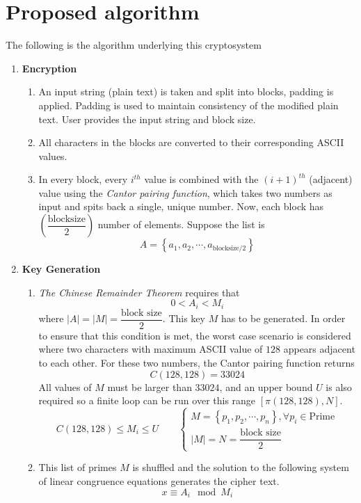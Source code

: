 \section{Proposed algorithm}
\label{sec:6}
The following is the algorithm underlying this cryptosystem
\begin{enumerate}
    \item \textbf{Encryption}
    \begin{enumerate}
        \item An input string (plain text) is taken and split into blocks, padding is applied. Padding is used to maintain consistency of the modified plain text. User provides the input string and block size.
        \item All characters in the blocks are converted to their corresponding ASCII values.
        \item In every block, every $i^{th}$ value is combined with the $(i+1)^{th}$ (adjacent) value using the \textit{Cantor pairing function}, which takes two numbers as input and spits back a single, unique number. Now, each block has $\left(\dfrac{\text{blocksize}}2\right)$ number of elements. Suppose the list is $$A=\left\{a_1,a_2,\cdots,a_{\text{blocksize}/2}\right\}$$
    \end{enumerate}
    \item \textbf{Key Generation}
    \begin{enumerate}
        \item \textit{The Chinese Remainder Theorem} requires that $$0<A_i<M_i$$ where $|A|=|M|=\dfrac{\text{block size}}{2}$. This key $M$ has to be generated. In order to ensure that this condition is met, the worst case scenario is considered where two characters with maximum ASCII value of $128$ appears adjacent to each other. For these two numbers, the Cantor pairing function returns $$C(128,128)=33024$$ All values of $M$ must be larger than $33024$, and an upper bound $U$ is also required so a finite loop can be run over this range $\left[\pi(128,128),N\right]$. $$C(128,128)\le M_i\le U\qquad \begin{cases} M=\left\{p_1,p_2,\cdots,p_n\right\},\forall p_i\in\text{Prime}\\|M|=N=\dfrac{\text{block size}}{2}\end{cases}$$
        \item This list of primes $M$ is shuffled and the solution to the following system of linear congruence equations generates the cipher text. $$x\equiv A_i\mod M_i$$
    \end{enumerate}

\end{enumerate}
